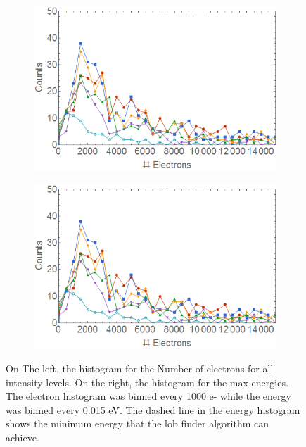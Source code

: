 \begin{figure}[h!]
\centering
\begin{subfigure}[l]{0.49\textwidth}
\includegraphics[width=1\textwidth]{../Images/results/MIR_He_waterIntensityscan/Helect.png} 
\end{subfigure}
\begin{subfigure}[l]{0.49\textwidth}
\includegraphics[width=1\textwidth]{../Images/results/MIR_He_waterIntensityscan/Helect.png}   				\end{subfigure}
\caption[MIR He-intensity dependence. Histogram]{On The left, the histogram for the Number of electrons for all intensity levels. On the right, the histogram for the max energies. The electron histogram was binned every 1000 e- while the energy was binned every 0.015 eV. The dashed line in the energy histogram shows the minimum energy that the lob finder algorithm can achieve.}
\label{fig:intehistowater}
\end{figure}
 
